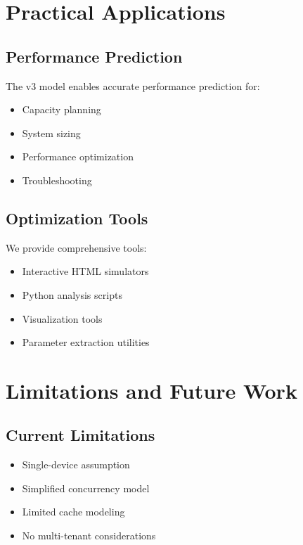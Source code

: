 \documentclass[11pt,twocolumn]{article}
\begin{document}
\section{Practical Applications}

\subsection{Performance Prediction}

The v3 model enables accurate performance prediction for:
\begin{itemize}
    \item Capacity planning
    \item System sizing
    \item Performance optimization
    \item Troubleshooting
\end{itemize}

\subsection{Optimization Tools}

We provide comprehensive tools:
\begin{itemize}
    \item Interactive HTML simulators
    \item Python analysis scripts
    \item Visualization tools
    \item Parameter extraction utilities
\end{itemize}

\section{Limitations and Future Work}

\subsection{Current Limitations}

\begin{itemize}
    \item Single-device assumption
    \item Simplified concurrency model
    \item Limited cache modeling
    \item No multi-tenant considerations
\end{itemize}
\end{document}
